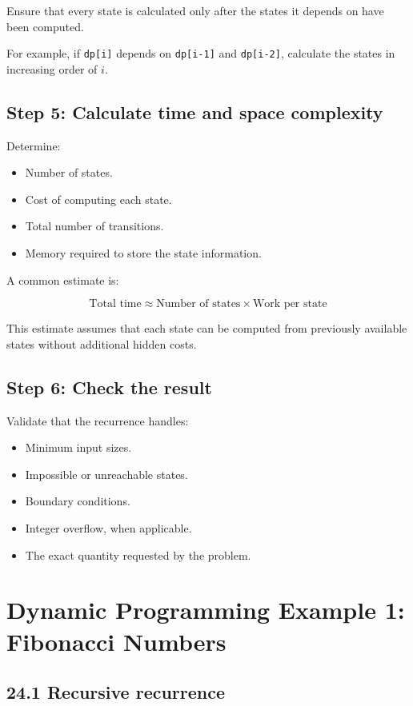 Ensure that every state is calculated only after the states it depends on have been computed.

For example, if \texttt{dp[i]} depends on \texttt{dp[i-1]} and \texttt{dp[i-2]}, calculate the states in increasing order of $i$.

\subsection{Step 5: Calculate time and space complexity}

Determine:

\begin{itemize}
    \item Number of states.
    \item Cost of computing each state.
    \item Total number of transitions.
    \item Memory required to store the state information.
\end{itemize}

A common estimate is:


\[
\boxed{ \text{Total time} \approx \text{Number of states} \times \text{Work per state} }
\]


This estimate assumes that each state can be computed from previously available states without additional hidden costs.

\subsection{Step 6: Check the result}

Validate that the recurrence handles:

\begin{itemize}
    \item Minimum input sizes.
    \item Impossible or unreachable states.
    \item Boundary conditions.
    \item Integer overflow, when applicable.
    \item The exact quantity requested by the problem.
\end{itemize}

\section{Dynamic Programming Example 1: Fibonacci Numbers}

\subsection{24.1 Recursive recurrence}

